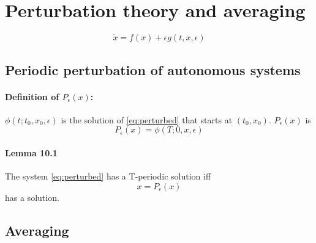\section{Perturbation theory and averaging}
\begin{equation}\label{eq:perturbed}
	\dot{x} = f(x) + \epsilon g(t,x,\epsilon)
\end{equation}

\subsection{Periodic perturbation of autonomous systems}
\paragraph{Definition of $P_\epsilon(x)$:}
$\phi(t;t_0,x_0,\epsilon)$ is the solution of \eqref{eq:perturbed} that starts at $(t_0,x_0)$. $P_\epsilon(x)$ is
\begin{equation}
	P_\epsilon(x) = \phi(T;0,x,\epsilon)
\end{equation}

\paragraph{Lemma 10.1}
The system \eqref{eq:perturbed} has a T-periodic solution iff
\begin{equation}
	x = P_\epsilon(x)
\end{equation}
has a solution.

\subsection{Averaging}
